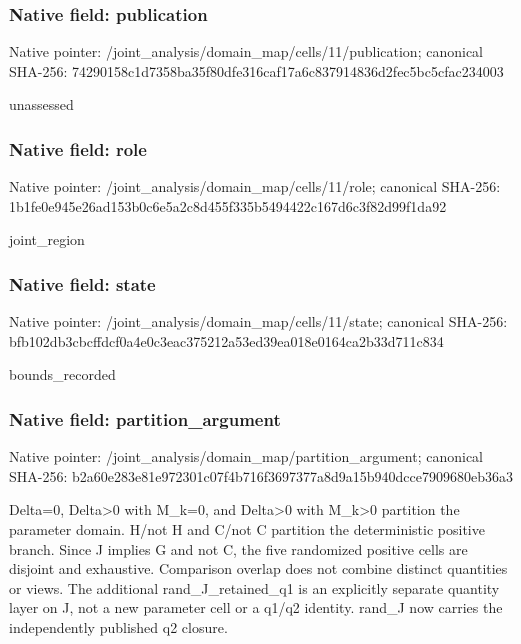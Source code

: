 \documentclass[10pt,a4paper]{article}
\begin{document}
\subsubsection{Native field: publication}
Native pointer: /joint\_\allowbreak{}analysis/domain\_\allowbreak{}map/cells/11/publication; canonical SHA-256: 74290158c1d7358ba35f80dfe316caf17a6c837914836d2fec5bc5cfac234003

\begingroup\raggedright\sloppy unassessed\par\endgroup

\subsubsection{Native field: role}
Native pointer: /joint\_\allowbreak{}analysis/domain\_\allowbreak{}map/cells/11/role; canonical SHA-256: 1b1fe0e945e26ad153b0c6e5a2c8d455f335b5494422c167d6c3f82d99f1da92

\begingroup\raggedright\sloppy joint\_\allowbreak{}region\par\endgroup

\subsubsection{Native field: state}
Native pointer: /joint\_\allowbreak{}analysis/domain\_\allowbreak{}map/cells/11/state; canonical SHA-256: bfb102db3cbcffdcf0a4e0c3eac375212a53ed39ea018e0164ca2b33d711c834

\begingroup\raggedright\sloppy bounds\_\allowbreak{}recorded\par\endgroup

\subsubsection{Native field: partition\_\allowbreak{}argument}
Native pointer: /joint\_\allowbreak{}analysis/domain\_\allowbreak{}map/partition\_\allowbreak{}argument; canonical SHA-256: b2a60e283e81e972301c07f4b716f3697377a8d9a15b940dcce7909680eb36a3

\begingroup\raggedright\sloppy Delta=\allowbreak{}0,\allowbreak{} Delta>0 with M\_\allowbreak{}k=\allowbreak{}0,\allowbreak{} and Delta>0 with M\_\allowbreak{}k>0 partition the parameter domain. H/\allowbreak{}not H and C/\allowbreak{}not C partition the deterministic positive branch. Since J implies G and not C,\allowbreak{} the five randomized positive cells are disjoint and exhaustive. Comparison overlap does not combine distinct quantities or views. The additional rand\_\allowbreak{}J\_\allowbreak{}retained\_\allowbreak{}q1 is an explicitly separate quantity layer on J,\allowbreak{} not a new parameter cell or a q1/\allowbreak{}q2 identity. rand\_\allowbreak{}J now carries the independently published q2 closure.\par\endgroup
\end{document}
